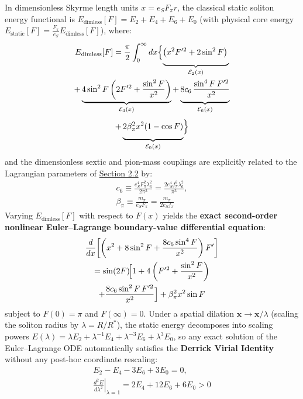 \documentclass[10pt,aps,prd,twocolumn,superscriptaddress,nofootinbib,floatfix,longbibliography,showkeys]{revtex4-2}
\begin{document}
In dimensionless Skyrme length units $x = e_S F_\pi r$, the classical static soliton energy functional is $E_{\text{dimless}}[F] = E_2 + E_4 + E_6 + E_0$ (with physical core energy $E_{\text{static}}[F] = \frac{F_\pi}{e_S} E_{\text{dimless}}[F]$), where:
\begin{multline}
E_{\text{dimless}}[F] = \frac{\pi}{2}\int_0^\infty dx\Bigl\{ \underbrace{\left(x^2 F'^2 + 2\sin^2 F\right)\vphantom{\left(\frac{\sin^2 F}{x^2}\right)}}_{\mathcal{E}_2(x)} \\
+ \underbrace{4\sin^2 F\left(2 F'^2 + \frac{\sin^2 F}{x^2}\right)}_{\mathcal{E}_4(x)} + \underbrace{8 c_6\,\frac{\sin^4 F\,F'^2}{x^2}\vphantom{\left(\frac{\sin^2 F}{x^2}\right)}}_{\mathcal{E}_6(x)} \\
+ \underbrace{2\beta_\pi^2 x^2 (1 - \cos F)\vphantom{\left(\frac{\sin^2 F}{x^2}\right)}}_{\mathcal{E}_0(x)} \Bigr\}
\end{multline}
and the dimensionless sextic and pion-mass couplings are explicitly related to the Lagrangian parameters of \hyperref[sec:2.2]{Section 2.2} by:
\begin{equation}\begin{gathered}
c_6 \equiv \frac{e_S^4 F_\pi^2 \lambda_6^2}{2\pi^3} = \frac{2 e_S^4 f_\pi^2 \lambda_6^2}{\pi^3}, \\
\beta_\pi \equiv \frac{m_\pi}{e_S F_\pi} = \frac{m_\pi}{2 e_S f_\pi}
\end{gathered}\end{equation}
Varying $E_{\text{dimless}}[F]$ with respect to $F(x)$ yields the \textbf{exact second-order nonlinear Euler--Lagrange boundary-value differential equation}:
\begin{multline}
\frac{d}{dx}\!\left[\left(x^2 + 8\sin^2 F + \frac{8 c_6 \sin^4 F}{x^2}\right) F'\right] \\
= \sin(2F)\!\Bigl[1 + 4\left(F'^2 + \frac{\sin^2 F}{x^2}\right) \\
+ \frac{8 c_6 \sin^2 F\,F'^2}{x^2}\Bigr] + \beta_\pi^2 x^2 \sin F
\end{multline}
subject to $F(0) = \pi$ and $F(\infty) = 0$. Under a spatial dilation $\mathbf{x} \to \mathbf{x}/\lambda$ (scaling the soliton radius by $\lambda = R/R^*$), the static energy decomposes into scaling powers $E(\lambda) = \lambda E_2 + \lambda^{-1} E_4 + \lambda^{-3} E_6 + \lambda^3 E_0$, so any exact solution of the Euler--Lagrange ODE automatically satisfies the \textbf{Derrick Virial Identity} \cite{ref18} without any post-hoc coordinate rescaling:
\begin{equation}\begin{gathered}
E_2 - E_4 - 3E_6 + 3E_0 = 0, \\
\left.\frac{d^2 E}{d\lambda^2}\right|_{\lambda=1} = 2E_4 + 12E_6 + 6E_0 > 0
\end{gathered}\end{equation}
\end{document}
